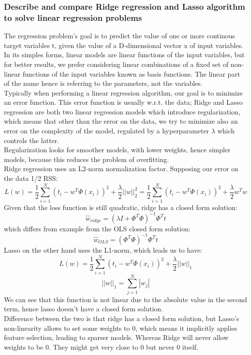 \subsubsection{Describe and compare Ridge regression and Lasso algorithm to solve linear regression problems}
    The regression problem's goal is to predict the value of one or more continous target variables t, given the value of a D-dimensional vector x of input variables. In its simples forms, linear models are linear functions of the input variables, but for better results, we prefer considering linear combinations of a fixed set of non-linear functions of the input variables known as basis functions. The linear part of the name hence is referring to the parameters, not the variables.\\
    Typically when performing a linear regression algorithm, our goal is to minimize an error function. This error function is usually w.r.t. the data; Ridge and Lasso regression are both two linear regression models which introduce regularization, which means that other than the error on the data, we try to minimize also an error on the complexity of the model, regulated by a hyperparameter $\lambda$ which controls the latter.\\
    Regularization looks for smoother models, with lower weights, hence simpler models, because this reduces the problem of overfitting.\\
    Ridge regression uses an L2-norm normalization factor. Supposing our error on the data 1/2 RSS:
    $$
    L(w) = \frac{1}{2}  \sum_{i=1} ^N (t_i - w^T \Phi(x_i))^2 + \frac{\lambda}{2} || w||^2 _2 = \frac{1}{2}  \sum_{i=1} ^N (t_i - w^T \Phi(x_i))^2 + \frac{\lambda}{2}w^T w
    $$
    Given that the loss function is still quadratic, ridge has a closed form solution:
    $$
    \hat{w}_{ridge} = (\lambda I + \Phi ^T \Phi)^{-1} \Phi^T t 
    $$
    which differs from example from the OLS closed form solution:
    $$
    \hat w _{OLS} = (\Phi ^T \Phi)^{-1} \Phi^T t 
    $$
    Lasso on the other hand uses the L1-norm, which leads us to have:
    $$
    L(w) = \frac{1}{2}  \sum_{i=1} ^N (t_i - w^T \Phi(x_i))^2 + \frac{\lambda}{2} ||w||_1
    $$
    $$||w||_1 = \sum_{j=1}^N |w_j|$$
    We can see that this function is not linear due to the absolute value in the second term, hence lasso doesn't have a closed form solution.\\
    Difference between the two is that ridge has a closed form solution, but Lasso's non-linearity allows to set some weights to 0, which means it implicitly applies feature selection, leading to sparser models. Whereas Ridge will never allow weights to be 0. They might get very close to 0 but never 0 itself.

